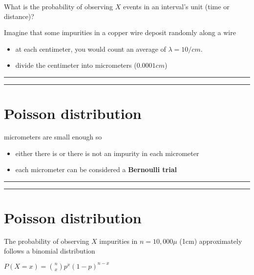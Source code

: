 \documentclass[
]{book}
\providecommand{\tightlist}{%
  \setlength{\itemsep}{0pt}\setlength{\parskip}{0pt}}
\begin{document}
What is the probability of observing \(X\) events in an interval's unit (time or distance)?

Imagine that some impurities in a copper wire deposit randomly along a wire

\begin{itemize}
\tightlist
\item
  at each centimeter, you would count an average of \(\lambda=10/cm\).
\item
  divide the centimeter into micrometers (\(0.0001cm\))
\end{itemize}

\begin{center}\rule{0.5\linewidth}{0.5pt}\end{center}

\begin{center}\rule{0.5\linewidth}{0.5pt}\end{center}

\hypertarget{poisson-distribution}{%
\section{Poisson distribution}\label{poisson-distribution}}

micrometers are small enough so

\begin{itemize}
\tightlist
\item
  either there is or there is not an impurity in each micrometer
\item
  each micrometer can be considered a \textbf{Bernoulli trial}
\end{itemize}

\begin{center}\rule{0.5\linewidth}{0.5pt}\end{center}

\begin{center}\rule{0.5\linewidth}{0.5pt}\end{center}

\hypertarget{poisson-distribution-1}{%
\section{Poisson distribution}\label{poisson-distribution-1}}

The probability of observing \(X\) impurities in \(n=10,000\mu\) (1cm) approximately follows a binomial distribution

\(P(X=x)=\binom n x p^x(1-p)^{n-x}\)
\end{document}
